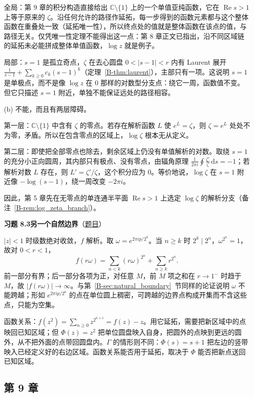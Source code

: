 \documentclass[11pt,a4paper]{article}
\newcommand{\CC}{\mathbb{C}}
\newcommand{\dd}{\,\mathrm{d}}
\renewcommand{\Re}{\operatorname{Re}}
\newcommand{\bref}[1]{\ref*{B-#1}}
\newcommand{\Sol}[2]{%
  \par\addvspace{1.2em}\noindent
  \hypertarget{s:#1}{}\textbf{习题 #1\quad #2}\hfill{\small（\hyperlink{q:#1}{题目}）}\par
  \nopagebreak\smallskip}
\begin{document}
全局：第 9 章的积分构造直接给出 $\CC\setminus\{1\}$ 上的一个单值亚纯函数，它在 $\Re s>1$ 上等于原来的 $\zeta$。沿任何允许的路径作延拓，每一步得到的函数元素都与这个整体函数在重叠处一致（延拓唯一性），所以终点处的值就是整体函数在该点的值，与路径无关。仅凭唯一性定理不能得出这一点：第 8 章正文已指出，沿不同区域链的延拓未必能拼成整体单值函数，$\log z$ 就是例子。

局部：$s=1$ 是孤立奇点，$\zeta$ 在去心圆盘 $0<|s-1|<r$ 内有 Laurent 展开 $\frac1{s-1}+\sum_{k\ge0}c_k(s-1)^k$（定理~\bref{thm:laurent}），主部只有一项。这说明 $s=1$ 是单极点，而不是像 $\log z$ 在 $0$ 那样的对数型分支点：绕它一周，函数值不变。但它只描述 $s=1$ 附近，单独不能保证远处的路径相容。

(b) 不能，而且有两层障碍。

第一层：$\CC\setminus\{1\}$ 中含有 $\zeta$ 的零点。若存在解析函数 $L$ 使 $e^L=\zeta$，则 $\zeta=e^L$ 处处不为零，矛盾。所以在包含零点的区域上，$\log\zeta$ 根本无从定义。

第二层：即使把全部零点也除去，剩余区域上仍没有单值解析的对数。取绕 $s=1$ 的充分小正向圆周，其内部只有极点、没有零点，由辐角原理 $\frac1{2\pi i}\oint\frac{\zeta'}{\zeta}\dd s=-1$；若解析对数 $L$ 存在，则 $L'=\zeta'/\zeta$，这个积分应为 $0$。等价地说，$\log\zeta$ 在 $s=1$ 附近像 $-\log(s-1)$，绕一周改变 $-2\pi i$。

因此，第 5 章先在无零点的单连通半平面 $\Re s>1$ 上选定 $\log\zeta$ 的解析分支（备注~\bref{rem:log_zeta_branch}）。

\Sol{8.3}{另一个自然边界}
$|z|<1$ 时级数绝对收敛，$f$ 解析。取 $\omega=e^{2\pi ip/2^k}$。当 $n\ge k$ 时 $2^k\mid2^n$，$\omega^{2^n}=1$，故对 $0<r<1$，
\[
  f(r\omega)=\sum_{n<k}(r\omega)^{2^n}+\sum_{n\ge k}r^{2^n}.
\]
前一部分有界；后一部分各项为正，对任意 $M$，前 $M$ 项之和在 $r\to1^-$ 时趋于 $M$，故 $|f(r\omega)|\to\infty$。与第~\bref{sec:natural_boundary}~节同样的论证说明 $\omega$ 不能跨越；形如 $e^{2\pi ip/2^k}$ 的点在单位圆上稠密，可跨越的边界点构成开集而不含这些点，只能为空集。

函数关系：$f(z^2)=\sum_{n\ge0}z^{2^{n+1}}=f(z)-z$。用它延拓，需要把新区域中的点映回已知区域；但 $\Phi(z)=z^2$ 把单位圆盘映入自身，把圆外的点映到更远的圆外，从不把外面的点带回圆盘内。$\Gamma$ 的情形则不同：$\Phi(s)=s+1$ 把左边的竖带映入已经定义好的右边区域。函数关系能否用于延拓，取决于 $\Phi$ 能否把新点送回已知区域。

\subsection*{第 9 章}
\end{document}
